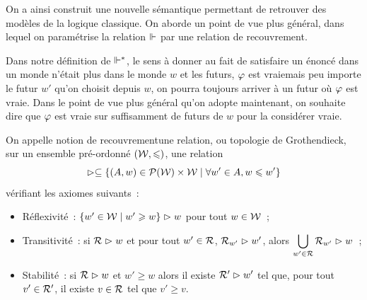 \begin{problem}
  
  On a ainsi construit une nouvelle sémantique permettant de retrouver des
  modèles de la logique classique. On aborde un point de vue plus général, dans
  lequel on paramétrise la relation $\Vdash$ par une relation de recouvrement.

  Dans notre définition de $\Vdash^*$, le sens à donner au fait de satisfaire
  un énoncé dans un monde n'était plus \og dans le monde $w$ et les futurs,
  $\varphi$ est vraie\fg mais \og peu importe le futur $w'$ qu'on choisit depuis
  $w$, on pourra toujours arriver à un futur où $\varphi$ est vraie\fg. Dans le
  point de vue plus général qu'on adopte maintenant, on souhaite dire que
  \og $\varphi$ est vraie sur suffisamment de futurs de $w$ pour la considérer
  vraie\fg.

  On appelle \og notion de recouvrement\fg une relation, ou topologie de
  Grothendieck, sur un ensemble pré-ordonné $(\mathcal{W},\leqslant)$, une relation
  \[\mathrel{\rhd}\subseteq
  \left\{ (A,w)\in\mathcal{P}(\mathcal{W})\times\mathcal{W} \;\middle\vert\; \forall w' \in A,w\leqslant w' \right\}\]
  vérifiant les axiomes suivants~:
  \begin{itemize}
  \item Réflexivité~: $\left\{ w'\in\mathcal{W} \;\middle\vert\; w' \geqslant w \right\}\mathrel{\rhd} w$ pour tout
    $w\in\mathcal{W}$~;
  \item Transitivité~: si $\mathcal R\mathrel{\rhd} w$ et pour tout $w' \in\mathcal R$,
    $\mathcal R_{w'}\mathrel{\rhd} w'$, alors
    $\displaystyle\bigcup_{w' \in \mathcal R} \mathcal R_{w'}\mathrel{\rhd} w$~;
  \item Stabilité~: si $\mathcal R\mathrel{\rhd} w$ et $w' \geq w$ alors il existe
    $\mathcal R'\mathrel{\rhd} w'$ tel que, pour tout $v'\in \mathcal R'$, il existe
    $v \in \mathcal R$ tel que $v' \geq v$.
  \end{itemize}


\end{problem}
